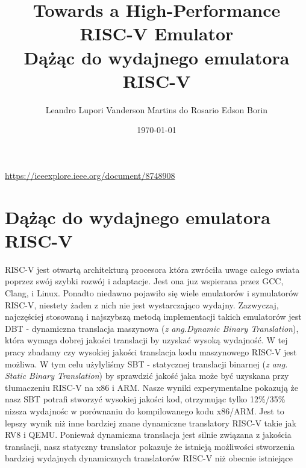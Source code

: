 \documentclass[11pt]{article}
\author{Leandro Lupori Vanderson Martins do Rosario Edson Borin}
\date{\today}
\title{Towards a High-Performance RISC-V Emulator\\\medskip
\large Dążąc do wydajnego emulatora RISC-V}
\begin{document}
\maketitle
\tableofcontents \clearpage\url{https://ieeexplore.ieee.org/document/8748908}

\section{Dążąc do wydajnego emulatora RISC-V}
\label{sec:orgd88d9a1}
RISC-V jest otwartą architekturą procesora która zwróciła uwage całego swiata poprzez swój szybki rozwój i adaptacje. Jest ona juz wspierana przez GCC, Clang, i Linux. Ponadto niedawno
pojawiło się wiele emulatorów i symulatorów RISC-V, niestety żaden z nich nie jest wystarczająco wydajny. Zazwyczaj, najczęściej stosowaną i najszybszą metodą implementacji takich emulatorów jest DBT - dynamiczna translacja maszynowa (\emph{z ang.Dynamic Binary Translation}), która wymaga dobrej jakości translacji by uzyskać wysoką wydajność. W tej pracy zbadamy czy wysokiej jakości translacja kodu maszynowego RISC-V jest możliwa. W tym celu użylyliśmy SBT - statycznej translacji binarnej (\emph{z ang. Static Binary Translation}) by sprawdzić jakość jaka może być uzyskana przy tłumaczeniu RISC-V na x86 i ARM. Nasze wyniki experymentalne pokazują że nasz SBT potrafi stworzyć wysokiej jakości kod, otrzymując tylko 12\%/35\% nizsza wydajnośc w porównaniu do kompilowanego kodu x86/ARM. Jest to lepszy wynik niż inne bardziej znane dynamiczne translatory RISC-V takie jak RV8 i QEMU. Ponieważ dynamiczna translacja jest silnie związana z jakościa translacji, nasz statyczny translator pokazuje że istnieją możliwości stworzenia bardziej wydajnych dynamicznych translatorów RISC-V niż obecnie istniejące
\end{document}
